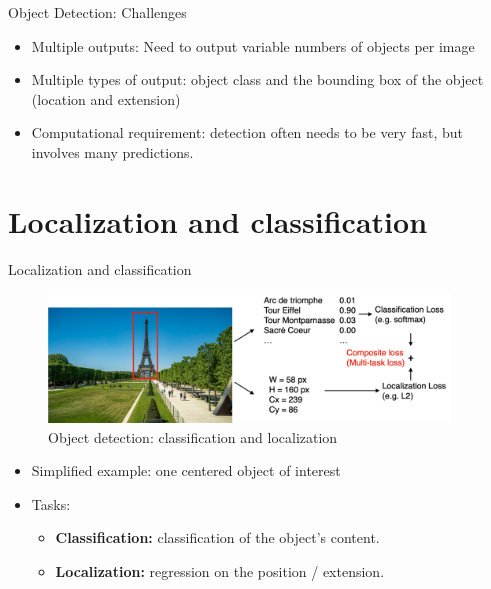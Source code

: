 \documentclass[xcolor=pdftex,dvipsnames,table]{beamer}
\begin{document}
\begin{frame}{Object Detection: Challenges}
\begin{itemize}
   \item Multiple outputs: Need to output variable numbers of objects per image
   \item Multiple types of output: object class and the bounding box of the object (location and extension)
   \item Computational requirement: detection often needs to be very fast, but involves many predictions.
\end{itemize}
\end{frame}

\section{Localization and classification}
\begin{frame}{Localization and classification}
\begin{figure}[htb]
   \centering
   \includegraphics[width=0.95\textwidth]{../graphics/class_and_loc.pdf}
   \caption{Object detection: classification and localization}
\end{figure}
\begin{itemize}
\item Simplified example: one centered object of interest
\item Tasks: 
\begin{itemize}
   \item \textbf{Classification: } classification of the object's content.
   \item \textbf{Localization: } regression on the position / extension.
\end{itemize}
\end{itemize}
\end{frame}
\end{document}
